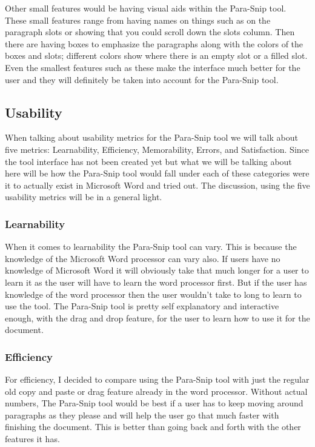 \documentclass{article}
\begin{document}
{	Other small features would be having visual aids within the Para-Snip tool. These small features range from having names on things such as on the paragraph slots or showing that you could scroll down the slots column. Then there are having boxes to emphasize the paragraphs along with the colors of the boxes and slots; different colors show where there is an empty slot or a filled slot. Even the smallest features such as these make the interface much better for the user and they will definitely be taken into account for the Para-Snip tool.	

\subsection{Usability}
	When talking about usability metrics for the Para-Snip tool we will talk about five metrics: Learnability, Efficiency, Memorability, Errors, and Satisfaction. Since the tool interface has not been created yet but what we will be talking about here will be how the Para-Snip tool would fall under each of these categories were it to actually exist in Microsoft Word and tried out. The discussion, using the five usability metrics will be in a general light.

\subsubsection{Learnability}
	When it comes to learnability the Para-Snip tool can vary. This is because the knowledge of the Microsoft Word processor can vary also. If users have no knowledge of Microsoft Word it will obviously take that much longer for a user to learn it as the user will have to learn the word processor first. But if the user has knowledge of the word processor then the user wouldn't take to long to learn to use the tool. The Para-Snip tool is pretty self explanatory and interactive enough, with the drag and drop feature, for the user to learn how to use it for the document.
	
\subsubsection{Efficiency} 
	For efficiency, I decided to compare using the Para-Snip tool with just the regular old copy and paste or drag feature already in the word processor. Without actual numbers, The Para-Snip tool would be best if a user has to keep moving around paragraphs as they please and will help the user go that much faster with finishing the document. This is better than going back and forth with the other features it has.

}
\end{document}
